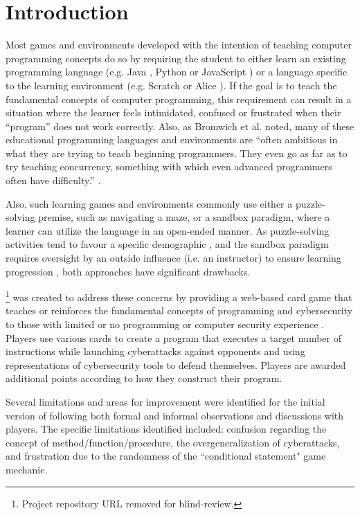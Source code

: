 \section{Introduction}

Most games and environments developed with the intention of teaching computer programming concepts do so by requiring the student to either learn an existing programming language (e.g. Java \cite{Robocode}, Python \cite{CodeWars,CheckIO} or JavaScript \cite{CodeCombat,CheckIO,Codingame}) or a language specific to the learning environment (e.g. Scratch \cite{Scratch} or Alice \cite{Alice}). If the goal is to teach the fundamental concepts of computer programming, this requirement can result in a situation where the learner feels intimidated, confused or frustrated when their ``program'' does not work correctly. Also, as Bromwich et al. noted, many of these educational programming languages and environments are ``often ambitious in what they are trying to teach beginning programmers. They even go as far as to try teaching concurrency, something with which even advanced programmers often have difficulty.'' \cite{Bromwich2012}.

Also, such learning games and environments commonly use either a puzzle-solving premise, such as navigating a maze, or a sandbox paradigm, where a learner can utilize the language in an open-ended manner. As puzzle-solving activities tend to favour a specific demographic \cite{Phan2012}, and the sandbox paradigm requires oversight by an outside influence (i.e. an instructor) to ensure learning progression \cite{Bromwich2012}, both approaches have significant drawbacks.    

\gameNameNS
\footnote{Project repository URL removed for blind-review.} 
was created to address these concerns by providing a web-based card game that teaches or reinforces the fundamental concepts of programming and cybersecurity to those with limited or no programming or computer security experience \cite{anvikPW}. Players use various cards to create a program that executes a target number of instructions while launching cyberattacks against opponents and using representations of cybersecurity tools to defend themselves. Players are awarded additional points according to how they construct their program.

Several limitations and areas for improvement were identified for the initial version of \gameName following both formal \cite{anvikPW} and informal observations and discussions with players. The specific limitations identified included: confusion regarding the concept of method/function/procedure, the overgeneralization of cyberattacks, and frustration due to the randomness of the ``conditional statement" game mechanic.

